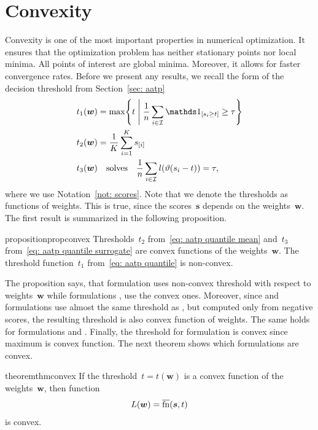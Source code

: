 \section{Convexity}\label{sec: convexity}

Convexity is one of the most important properties in numerical optimization. It ensures that the optimization problem has neither stationary points nor local minima. All points of interest are global minima. Moreover, it allows for faster convergence rates. Before we present any results, we recall the form of the decision threshold from Section~\ref{sec: aatp}
\begin{equation*}
  \begin{aligned}
    t_1(\bm{w}) & = \max \Set{t}{\frac{1}{n} \sum_{i \in \I} \Iverson{s_i \geq t} \geq \tau} \\
    t_2(\bm{w}) & = \frac{1}{K} \sum_{i=1}^{K} s_{[i]} \\
    t_3(\bm{w}) & \quad \text{solves} \quad \frac{1}{n} \sum_{i \in \I} l\Brac{\vartheta(s_i - t)} = \tau, \\
  \end{aligned}
\end{equation*}
where we use Notation~\ref{not: scores}. Note that we denote the thresholds as functions of weights. This is true, since the scores~$\bm{s}$ depends on the weights~$\bm{w}.$ The first result is summarized in the following proposition.

\begin{restatable}{proposition}{propconvex}\label{prop:convex}
  Thresholds~$t_2$ from~\eqref{eq: aatp quantile mean} and~$t_3$ from~\eqref{eq: aatp quantile surrogate} are convex functions of the weights~$\bm{w}$. The threshold function~$t_1$ from~\eqref{eq: aatp quantile} is non-convex.
\end{restatable}

\noindent The proposition says, that formulation \Grill uses non-convex threshold with respect to weights~$\bm{w}$ while formulations \TopMeanK, \PatMat use the convex ones. Moreover, since \tauFPL and \TopPushK formulations use almost the same threshold as \TopMeanK, but computed only from negative scores, the resulting threshold is also convex function of weights. The same holds for formulations \PatMat and \PatMatNP. Finally, the threshold for \TopPush formulation is convex since maximum is convex function. The next theorem shows which formulations are convex.

\begin{restatable}{theorem}{thmconvex}\label{thm:convex}
  If the threshold~$t = t(\bm{w})$ is a convex function of the weights~$\bm{w}$, then function
  \begin{equation*}
    L(\bm{w}) = \operatorname{\overline{fn}}(\bm{s}, t)
  \end{equation*}
  is convex.
\end{restatable}

